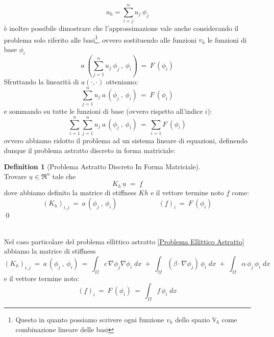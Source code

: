 \documentclass[12pt,a4paper]{report}
\theoremstyle{theorem}
\theoremstyle{theorem}
\theoremstyle{definition}
\newtheorem{definition}{Definition}[section]
\begin{document}
\[ u_{h} = \sum_{i = j}^{n} u_{j} \ \phi_{j} \]
è inoltre possibile dimostrare che l'approssimazione vale anche considerando il problema solo riferito alle basi\footnote{Questo in quanto possiamo scrivere ogni funzione $v_{h}$ dello spazio $\mathbb{V}_{h}$ come combinazione lineare delle basi}, ovvero sostituendo alle funzioni $v_{h}$ le funzioni di base $\phi_{i}$
\[ a \ \left( \sum_{j = 1}^{n} u_{j} \ \phi_{j} \ , \ \phi_{i} \right) \ = \ F \ \left(  \phi_{i} \right) \]
Sfruttando la linearità di $a(\cdot,\cdot)$ otteniamo:
\[ \sum_{j = 1}^{n} u_{j} \ a \, \left( \phi_{j} \ , \ \phi_{i} \right) \ = \ F \ \left(  \phi_{i} \right) \]
e sommando su tutte le funzioni di base (ovvero rispetto all'indice $i$):
\[ \sum_{i = 1}^{n} \sum_{j = 1}^{n} u_{j} \ a \, \left( \phi_{j} \ , \ \phi_{i} \right) \ = \ \sum_{i = 1} F \ \left(  \phi_{i} \right) \]
ovvero abbiamo ridotto il problema ad un sistema lineare di equazioni, definendo dunque il problema astratto discreto in forma matriciale:
\begin{definition} [Problema Astratto Discreto In Forma Matriciale]  \label{Problema Astratto Discreto In Forma Matriciale}
\hfill \\
Trovare $\underline{u}  \in \Re^{n}$ tale che
\[ K_{h} \, \underline{u} \; = \; \underline{f} \]
dove abbiamo definito la matrice di stiffness $Kh$  \label{Matrice Di Stiffness} e il vettore termine noto $\underline{f}$ come:
\[ (K_{h})_{i,j} \ = \ a \, \left( \phi_{j} \ , \ \phi_{i} \right) \qquad \qquad \qquad (\underline{f})_{i} \ = \ F \ \left(  \phi_{i} \right) \]
\qed
\end{definition}
\hfill \\
Nel caso particolare del problema ellittico astratto \ref{Problema Ellittico Astratto} abbiamo la matrice di stiffness  \label{Matrice Di Stiffness Problema Ellittico}
\[ (K_{h})_{i,j} \ = \ a \, \left( \phi_{j} \ , \ \phi_{i} \right) \ = \ \int_{\Omega}{c \, \nabla \phi_{j} \nabla \phi_{i} \; dx} \; + \; \int_{\Omega}{(\beta \cdot \nabla \phi_{j}) \, \phi_{i} \; dx} \; + \; \int_{\Omega}{\alpha \, \phi_{j} \, \phi_{i} \; dx} \]
e il vettore termine noto:
\[ (\underline{f})_{i} \ = \ F \ \left(  \phi_{i} \right) \ = \ \int_{\Omega}{f \, \phi_{i} \; dx} \]
\end{document}
